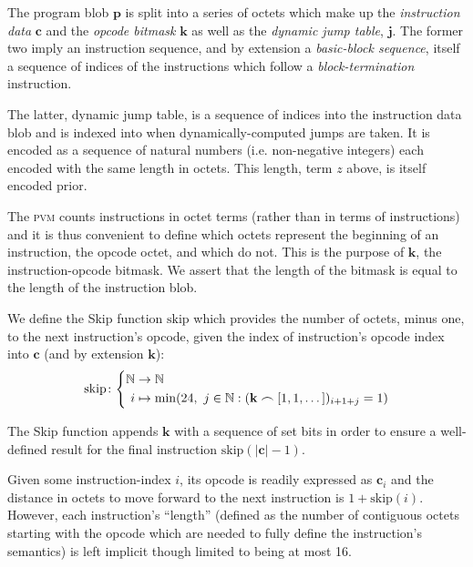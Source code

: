 The program blob $\mathbf{p}$ is split into a series of octets which make up the \emph{instruction data} $\mathbf{c}$ and the \emph{opcode bitmask} $\mathbf{k}$ as well as the \emph{dynamic jump table}, $\mathbf{j}$. The former two imply an instruction sequence, and by extension a \emph{basic-block sequence}, itself a sequence of indices of the instructions which follow a \emph{block-termination} instruction.

The latter, dynamic jump table, is a sequence of indices into the instruction data blob and is indexed into when dynamically-computed jumps are taken. It is encoded as a sequence of natural numbers (i.e. non-negative integers) each encoded with the same length in octets. This length, term $z$ above, is itself encoded prior.

The \textsc{pvm} counts instructions in octet terms (rather than in terms of instructions) and it is thus convenient to define which octets represent the beginning of an instruction, \ie the opcode octet, and which do not. This is the purpose of $\mathbf{k}$, the instruction-opcode bitmask. We assert that the length of the bitmask is equal to the length of the instruction blob.

\newcommand{\Fskip}{\text{skip}}

We define the Skip function $\Fskip$ which provides the number of octets, minus one, to the next instruction's opcode, given the index of instruction's opcode index into $\mathbf{c}$ (and by extension $\mathbf{k}$):
\begin{equation}
  \Fskip\colon\left\{\begin{aligned}
    \N &\to \N\\
    i &\mapsto \min(24,\ j \in \N : (\mathbf{k} \frown [1, 1, \dots])_{i + 1 + j} = 1)
  \end{aligned}\right.
\end{equation}

The Skip function appends $\mathbf{k}$ with a sequence of set bits in order to ensure a well-defined result for the final instruction $\Fskip(|\mathbf{c}| - 1)$.

Given some instruction-index $i$, its opcode is readily expressed as $\mathbf{c}_i$ and the distance in octets to move forward to the next instruction is $1 + \Fskip(i)$. However, each instruction's ``length'' (defined as the number of contiguous octets starting with the opcode which are needed to fully define the instruction's semantics) is left implicit though limited to being at most 16.

